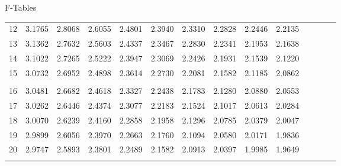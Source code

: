 \begin{frame}{F-Tables}
{\begin{tabular}{l|lllllllllllll}
     12 & 3.1765 & 2.8068 & 2.6055 & 2.4801 & 2.3940 & 2.3310 & 2.2828 & 2.2446 & 2.2135  \\[5pt] \arrayrulecolor{light-gray}\hline\arrayrulecolor{black}  
     13 & 3.1362 & 2.7632 & 2.5603 & 2.4337 & 2.3467 & 2.2830 & 2.2341 & 2.1953 & 2.1638  \\[5pt] \arrayrulecolor{light-gray}\hline\arrayrulecolor{black}  
     14 & 3.1022 & 2.7265 & 2.5222 & 2.3947 & 2.3069 & 2.2426 & 2.1931 & 2.1539 & 2.1220  \\[5pt] \arrayrulecolor{light-gray}\hline\arrayrulecolor{black}  
     15 & 3.0732 & 2.6952 & 2.4898 & 2.3614 & 2.2730 & 2.2081 & 2.1582 & 2.1185 & 2.0862  \\[5pt] \arrayrulecolor{light-gray}\hline\arrayrulecolor{black}  
     \\ 
     16 & 3.0481 & 2.6682 & 2.4618 & 2.3327 & 2.2438 & 2.1783 & 2.1280 & 2.0880 & 2.0553  \\[5pt] \arrayrulecolor{light-gray}\hline\arrayrulecolor{black}  
     17 & 3.0262 & 2.6446 & 2.4374 & 2.3077 & 2.2183 & 2.1524 & 2.1017 & 2.0613 & 2.0284  \\[5pt] \arrayrulecolor{light-gray}\hline\arrayrulecolor{black}  
     18 & 3.0070 & 2.6239 & 2.4160 & 2.2858 & 2.1958 & 2.1296 & 2.0785 & 2.0379 & 2.0047  \\[5pt] \arrayrulecolor{light-gray}\hline\arrayrulecolor{black}  
     19 & 2.9899 & 2.6056 & 2.3970 & 2.2663 & 2.1760 & 2.1094 & 2.0580 & 2.0171 & 1.9836  \\[5pt] \arrayrulecolor{light-gray}\hline\arrayrulecolor{black}  
     20 & 2.9747 & 2.5893 & 2.3801 & 2.2489 & 2.1582 & 2.0913 & 2.0397 & 1.9985 & 1.9649  \\[5pt] \arrayrulecolor{light-gray}\hline\arrayrulecolor{black}  
   \end{tabular}
}
  
\end{frame}


